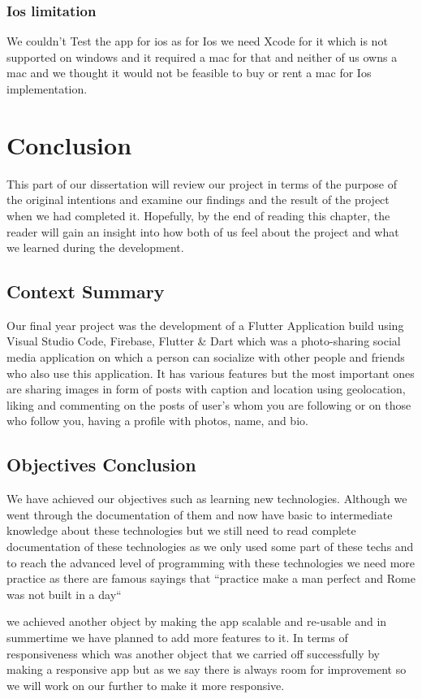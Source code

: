 \subsection{Ios limitation}
We couldn't Test the app for ios as for Ios we need Xcode for it which is not supported on windows and it required a mac for that and neither of us owns a mac and we thought it would not be feasible to buy or rent a mac for Ios implementation.

\chapter{Conclusion}

This part of our dissertation will review our project in terms of the purpose of the original intentions and examine our findings and the result of the project when we had completed it. Hopefully, by the end of reading this chapter, the reader will gain an insight into how both of us feel about the project and what we learned during the development.

\section{Context Summary}
Our final year project was the development of a Flutter Application build using Visual Studio Code, Firebase, Flutter \& Dart which was a photo-sharing social media application on which a person can socialize with other people and friends who also use this application. It has various features but the most important ones are sharing images in form of posts with caption and location using geolocation, liking and commenting on the posts of user's whom you are following or on those who follow you, having a profile with photos, name, and bio.
\section{Objectives Conclusion}
We have achieved our objectives such as learning new technologies. Although we went through the documentation of them and now have basic to intermediate knowledge about these technologies but we still need to read complete documentation of these technologies as we only used some part of these techs and to reach the advanced level of programming with these technologies we need more practice as there are famous sayings that ``practice make a man perfect and Rome was not built in a day``

we achieved another object by making the app scalable and re-usable and in summertime we have planned to add more features to it. In terms of responsiveness which was another object that we carried off successfully by making a responsive app but as we say there is always room for improvement so we will work on our further to make it more responsive.

